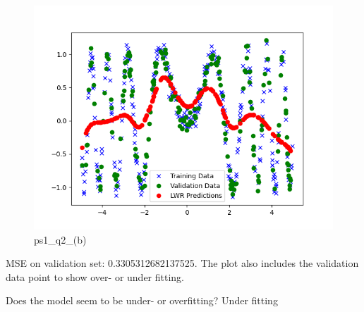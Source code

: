 \begin{answer}

\begin{figure}[H]
    \centering
    \includegraphics[width=0.5\linewidth]{ps1_q2_(b).png}
    \caption{ps1\_q2\_(b)}
    \label{fig:enter-label}
\end{figure}

MSE on validation set: 0.3305312682137525. The plot also includes the validation data point to show over- or under fitting.

Does the model seem to be under- or overfitting? Under fitting
\end{answer}
